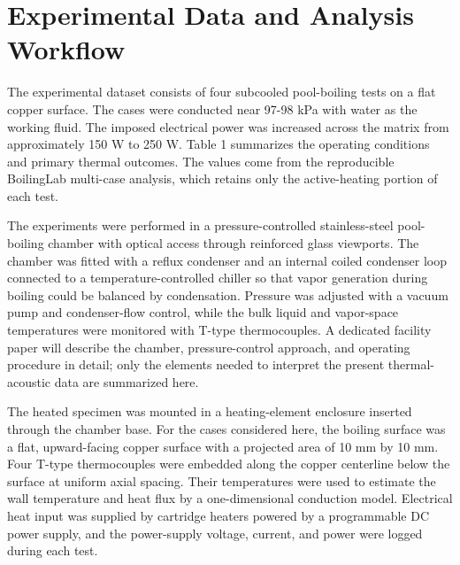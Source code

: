 \documentclass[final,1p,times]{elsarticle}
\begin{document}
\section{Experimental Data and Analysis Workflow}

The experimental dataset consists of four subcooled pool-boiling tests on a flat copper surface. The cases were conducted near 97-98 kPa with water as the working fluid. The imposed electrical power was increased across the matrix from approximately 150 W to 250 W. Table 1 summarizes the operating conditions and primary thermal outcomes. The values come from the reproducible BoilingLab multi-case analysis, which retains only the active-heating portion of each test.

The experiments were performed in a pressure-controlled stainless-steel pool-boiling chamber with optical access through reinforced glass viewports. The chamber was fitted with a reflux condenser and an internal coiled condenser loop connected to a temperature-controlled chiller so that vapor generation during boiling could be balanced by condensation. Pressure was adjusted with a vacuum pump and condenser-flow control, while the bulk liquid and vapor-space temperatures were monitored with T-type thermocouples. A dedicated facility paper will describe the chamber, pressure-control approach, and operating procedure in detail; only the elements needed to interpret the present thermal-acoustic data are summarized here.

The heated specimen was mounted in a heating-element enclosure inserted through the chamber base. For the cases considered here, the boiling surface was a flat, upward-facing copper surface with a projected area of 10 mm by 10 mm. Four T-type thermocouples were embedded along the copper centerline below the surface at uniform axial spacing. Their temperatures were used to estimate the wall temperature and heat flux by a one-dimensional conduction model. Electrical heat input was supplied by cartridge heaters powered by a programmable DC power supply, and the power-supply voltage, current, and power were logged during each test.

\begin{table}[t]
  \centering
  \caption{Summary of active-heating cases used in this draft.}
\end{table}
\end{document}
